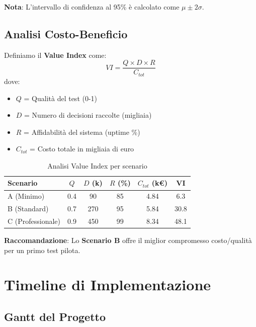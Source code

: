\documentclass[a4paper,11pt]{article}
\begin{document}
\textbf{Nota}: L'intervallo di confidenza al 95\% è calcolato come $\mu \pm 2\sigma$.

\subsection{Analisi Costo-Beneficio}

Definiamo il \textbf{Value Index} come:
\begin{equation}
    VI = \frac{Q \times D \times R}{C_{tot}}
\end{equation}
dove:
\begin{itemize}
    \item $Q$ = Qualità del test (0-1)
    \item $D$ = Numero di decisioni raccolte (migliaia)
    \item $R$ = Affidabilità del sistema (uptime \%)
    \item $C_{tot}$ = Costo totale in migliaia di euro
\end{itemize}

\begin{table}[H]
    \centering
    \begin{tabular}{lccccc}
        \toprule
        \textbf{Scenario} & $Q$ & $D$ (k) & $R$ (\%) & $C_{tot}$ (k€) & \textbf{VI} \\
        \midrule
        A (Minimo) & 0.4 & 90 & 85 & 4.84 & 6.3 \\
        B (Standard) & 0.7 & 270 & 95 & 5.84 & 30.8 \\
        C (Professionale) & 0.9 & 450 & 99 & 8.34 & 48.1 \\
        \bottomrule
    \end{tabular}
    \caption{Analisi Value Index per scenario}
\end{table}

\textbf{Raccomandazione}: Lo \textbf{Scenario B} offre il miglior compromesso costo/qualità per un primo test pilota.

\section{Timeline di Implementazione}

\subsection{Gantt del Progetto}
\end{document}
